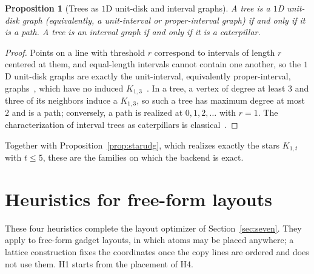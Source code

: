 \documentclass[a4paper,fleqn]{cas-sc}
\newtheorem{proposition}[theorem]{Proposition}
\begin{document}
\begin{proposition}[Trees as $1$D unit-disk and interval graphs]
\label{prop:treepath}
A tree is a $1$D unit-disk graph (equivalently, a unit-interval or proper-interval
graph) if and only if it is a path. A tree is an interval graph if and only if it is
a caterpillar.
\end{proposition}

\begin{proof}
Points on a line with threshold $r$ correspond to intervals of length $r$ centered at
them, and equal-length intervals cannot contain one another, so the $1$D unit-disk
graphs are exactly the unit-interval, equivalently proper-interval,
graphs~\cite{Roberts1969,Golumbic1980}, which have no induced
$K_{1,3}$~\cite{Roberts1969}. In a tree, a vertex of degree at least $3$ and three of
its neighbors induce a $K_{1,3}$, so such a tree has maximum degree at most $2$
and is a path; conversely, a path is realized at $0,1,2,\dots$ with $r=1$. The
characterization of interval trees as caterpillars is
classical~\cite{LekkerkerkerBoland1962,Golumbic1980}.
\end{proof}

\noindent Together with Proposition~\ref{prop:starudg}, which realizes exactly the
stars $K_{1,t}$ with $t\le5$, these are the families on which the backend is exact.


\section{Heuristics for free-form layouts}
\label{app:freeform}

These four heuristics complete the layout optimizer of Section~\ref{sec:seven}. They
apply to free-form gadget layouts, in which atoms may be placed anywhere; a lattice
construction fixes the coordinates once the copy lines are ordered and does not use
them. H1 starts from the placement of H4.
\end{document}

